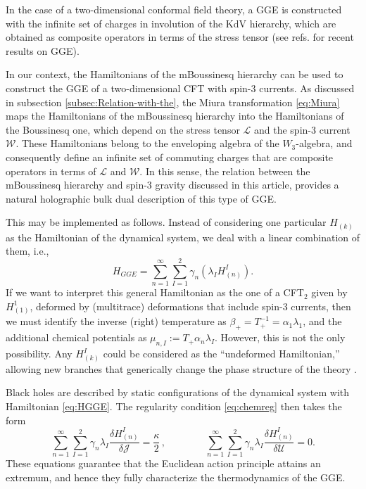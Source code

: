 \documentclass[letterpaper,11pt,oneside]{book}
\begin{document}
In the case of a two-dimensional conformal field theory, a GGE is
constructed with the infinite set of charges in involution of the
KdV hierarchy, which are obtained as composite operators in terms
of the stress tensor \cite{Sasaki:1987mm,Eguchi:1989hs,Bazhanov:1994ft}
(see refs. \cite{Calabrese:2011vdk,Sotiriadis:2014uza,PhysRevLett.115.157201,Vidmar_2016,deBoer:2016bov,Perez:2016vqo,Pozsgay_2017,Dymarsky:2018lhf,Maloney:2018hdg,Maloney:2018yrz,Dymarsky:2018iwx,Brehm:2019fyy,Dymarsky:2019etq,Dymarsky:2020tjh}
for recent results on GGE).

In our context, the Hamiltonians of the mBoussinesq hierarchy can
be used to construct the GGE of a two-dimensional CFT with spin-3
currents. As discussed in subsection \ref{subsec:Relation-with-the},
the Miura transformation \eqref{eq:Miura} maps the Hamiltonians of
the mBoussinesq hierarchy into the Hamiltonians of the Boussinesq
one, which depend on the stress tensor $\mathcal{L}$ and the spin-3
current $\mathcal{W}$. These Hamiltonians belong to the enveloping
algebra of the $W_{3}$-algebra, and consequently define an infinite
set of commuting charges that are composite operators in terms of
$\mathcal{L}$ and $\mathcal{W}$. In this sense, the relation between
the mBoussinesq hierarchy and spin-3 gravity discussed in this article,
provides a natural holographic bulk dual description of this type
of GGE.

This may be implemented as follows. Instead of considering one particular
$H_{\left(k\right)}$ as the Hamiltonian of the dynamical system,
we deal with a linear combination of them, i.e.,
\begin{equation}
	H_{GGE}=\sum_{n=1}^{\infty}\sum_{I=1}^{2}\gamma_{n}\left(\lambda_{I}H_{\left(n\right)}^{I}\right).\label{eq:HGGE}
\end{equation}
If we want to interpret this general Hamiltonian as the one of a CFT$_{2}$
given by $H_{\left(1\right)}^{1}$, deformed by (multitrace) deformations
that include spin-3 currents, then we must identify the inverse (right)
temperature as $\beta_{+}=T_{+}^{-1}=\alpha_{1}\lambda_{1}$, and
the additional chemical potentials as $\mu_{n,I}:=T_{+}\alpha_{n}\lambda_{I}$.
However, this is not the only possibility. Any $H_{\left(k\right)}^{I}$
could be considered as the ``undeformed Hamiltonian,'' allowing
new branches that generically change the phase structure of the theory
\cite{Perezinprog}.

Black holes are described by static configurations of the dynamical
system with Hamiltonian \eqref{eq:HGGE}. The regularity condition
\eqref{eq:chemreg} then takes the form 
\[
\sum_{n=1}^{\infty}\sum_{I=1}^{2}\gamma_{n}\lambda_{I}\frac{\delta H_{\left(n\right)}^{I}}{\delta\mathcal{J}}=\frac{\kappa}{2}\,,\qquad\qquad\sum_{n=1}^{\infty}\sum_{I=1}^{2}\gamma_{n}\lambda_{I}\frac{\delta H_{\left(n\right)}^{I}}{\delta\mathcal{\mathcal{U}}}=0.
\]
These equations guarantee that the Euclidean action principle attains
an extremum, and hence they fully characterize the thermodynamics
of the GGE.
\end{document}
